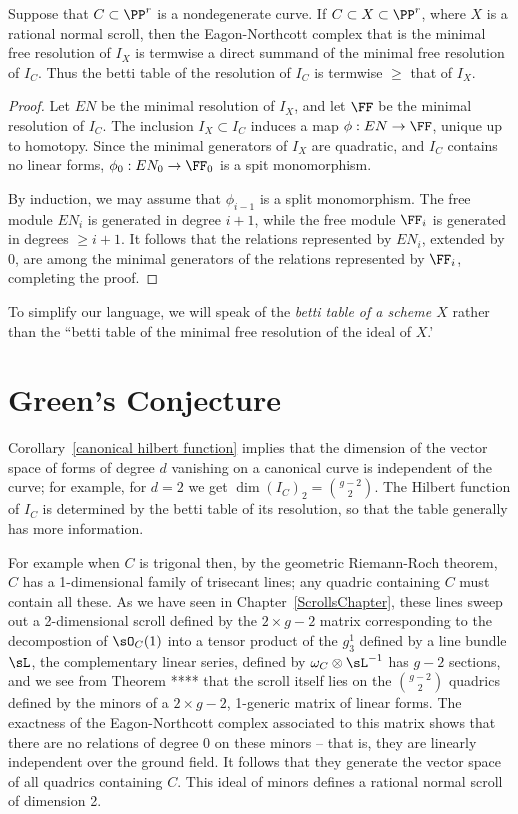 \begin{proposition}
Suppose that $C\subset \PP^r$ is a nondegenerate curve. If $C\subset X \subset \PP^r$, where $X$ is a rational
normal scroll, then the Eagon-Northcott complex that is  the minimal free resolution of $I_X$ is termwise a direct summand
of the minimal free resolution of $I_C$. Thus the betti table of the resolution of $I_C$ is termwise $\geq$ that of $I_X$.
\end{proposition}

\begin{proof}
Let $EN$ be the minimal resolution of $I_X$, and let $\FF$ be the minimal resolution of $I_C$.
The inclusion $I_X \subset I_C$ induces a map $\phi: EN\to \FF$, unique up to homotopy. Since the minimal generators of $I_X$ are quadratic, and $I_C$ contains no linear forms, $\phi_0: EN_0\to \FF_0$ is a spit monomorphism.

By induction, we may assume that $\phi_{i-1}$ is a split monomorphism. The free module $EN_{i}$ is generated in 
degree $i+1$, while the free module $\FF_i$ is generated in degrees $\geq i+1$. It follows that the relations
represented by $EN_i$, extended by 0, are among the minimal generators of the relations represented by $\FF_i$,
completing the proof.
 \end{proof}
 
 To simplify our language, we will speak of the \emph{betti table of a scheme $X$} rather than the ``betti table of the minimal free resolution of the ideal of $X$.'
\section{Green's Conjecture}

Corollary~\ref{canonical hilbert function} implies that the dimension of the vector space of forms of degree $d$
vanishing on a canonical curve is independent of the curve; for example, for $d=2$ we get
$
\dim ({I_{C}})_{2} = {g-2\choose 2}.
$
The Hilbert function of $I_C$ is determined by the betti table of its resolution, so that the table generally has more information.

 For example
when $C$ is trigonal then, by the geometric Riemann-Roch theorem, $C$ has a 1-dimensional family of trisecant lines; any quadric containing $C$ must contain all these. As we have seen in Chapter~\ref{ScrollsChapter}, these lines sweep
out a 2-dimensional scroll defined by the $2\times g-2$ matrix corresponding to the decompostion of $\sO_C(1)$
into a tensor product of the $g^{1}_{3}$ defined by a line bundle $\sL$, the complementary linear series,
defined by $\omega_{C}\otimes \sL^{-1}$ has $g-2$ sections, and we see from Theorem ****
that the scroll itself lies on the ${g-2\choose 2}$ quadrics defined by the minors of a $2\times g-2$, 1-generic matrix of linear forms. The exactness of the Eagon-Northcott complex associated to this matrix shows that there are no relations of degree 0 on these minors -- that is, they are linearly independent over the ground field. It follows that they generate the vector space of all quadrics containing $C$. This
ideal of minors defines a rational normal scroll of dimension 2.


